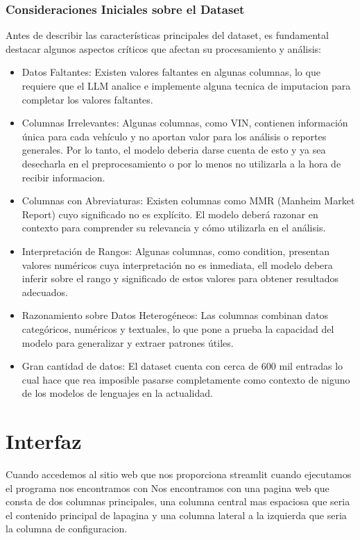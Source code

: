 \subsubsection{Consideraciones Iniciales sobre el Dataset}
Antes de describir las características principales del dataset, es fundamental destacar algunos aspectos críticos que afectan su procesamiento y análisis:
\begin{itemize}
	\item{Datos Faltantes:}
	Existen valores faltantes en algunas columnas, lo que requiere que el LLM analice e implemente alguna tecnica de imputacion para completar los valores faltantes.
	
	\item{Columnas Irrelevantes:}
	Algunas columnas, como VIN, contienen información única para cada vehículo y no aportan valor para los análisis o reportes generales. Por lo tanto, el modelo deberia darse cuenta de esto y ya sea desecharla en el preprocesamiento o por lo menos no utilizarla a la hora de recibir informacion.
	
	\item{Columnas con Abreviaturas:}
	Existen columnas como MMR (Manheim Market Report) cuyo significado no es explícito. El modelo deberá razonar en contexto para comprender su relevancia y cómo utilizarla en el análisis.
	
	\item{Interpretación de Rangos:}
	Algunas columnas, como condition, presentan valores numéricos cuya interpretación no es inmediata, ell modelo debera inferir sobre el rango y significado de estos valores para obtener resultados adecuados.
	
	\item{Razonamiento sobre Datos Heterogéneos:}
	Las columnas combinan datos categóricos, numéricos y textuales, lo que pone a prueba la capacidad del modelo para generalizar y extraer patrones útiles.
	
	\item{Gran cantidad de datos:}
	El dataset cuenta con cerca de 600 mil entradas lo cual hace que rea imposible pasarse completamente como contexto de niguno de los modelos de lenguajes en la actualidad.
\end{itemize}

\section{Interfaz}
Cuando accedemos al sitio web que nos proporciona streamlit cuando ejecutamos el programa nos encontramos con Nos encontramos con una pagina web que consta de dos columnas principales, una columna central mas espaciosa que seria el contenido principal de lapagina y una columna lateral a la izquierda que seria la columna de configuracion.

